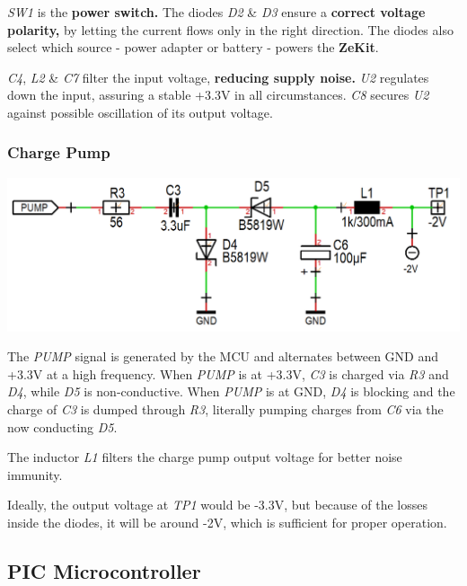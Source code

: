 \documentclass{scrartcl}
\begin{document}
\emph{SW1} is the \textbf{power switch.} The diodes \emph{D2} \& \emph{D3} ensure a \textbf{correct voltage polarity,} by letting the current flows only in the right direction. The diodes also select which source - power adapter or battery - powers the \textbf{ZeKit}.

\emph{C4}, \emph{L2} \& \emph{C7} filter the input voltage, \textbf{reducing supply noise.} \emph{U2} regulates down the input, assuring a stable +3.3V in all circumstances. \emph{C8} secures \emph{U2} against possible oscillation of its output voltage.

\subsubsection{Charge Pump}

\begin{center}
    \includegraphics[scale=0.3]{assets/schema-pump.png}
\end{center}

The \emph{PUMP} signal is generated by the MCU and alternates between GND and +3.3V at a high frequency. When \emph{PUMP} is at +3.3V, \emph{C3} is charged via \emph{R3} and \emph{D4}, while \emph{D5} is non-conductive. When \emph{PUMP} is at GND, \emph{D4} is blocking and the charge of \emph{C3} is dumped through \emph{R3}, literally pumping charges from \emph{C6} via the now conducting \emph{D5}.

The inductor \emph{L1} filters the charge pump output voltage for better noise immunity.

Ideally, the output voltage at \emph{TP1} would be -3.3V, but because of the losses inside the diodes, it will be around -2V, which is sufficient for proper operation.

\subsection{PIC Microcontroller}
\end{document}
